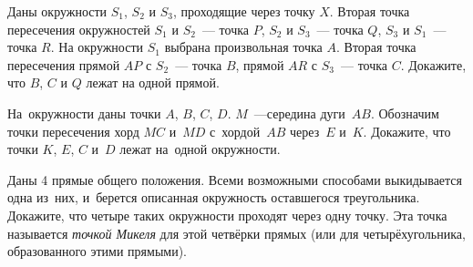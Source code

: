 \begin{problems}

\item
Даны окружности $S_1$, $S_2$ и $S_3$, проходящие через точку $X$.
Вторая точка пересечения окружностей $S_1$ и $S_2$~--- точка $P$,
$S_2$ и $S_3$~--- точка $Q$, $S_3$ и $S_1$~--- точка $R$.
На окружности $S_1$ выбрана произвольная точка $A$.
Вторая точка пересечения прямой $AP$ с $S_2$~--- точка $B$,
прямой $AR$ с $S_3$~--- точка $C$.
Докажите, что $B$, $C$ и $Q$ лежат на одной прямой.

\item
На~окружности даны точки $A$, $B$, $C$, $D$.
$M$~---середина дуги~$AB$.
Обозначим точки пересечения хорд $MC$ и~$MD$ с~хордой~$AB$ через~$E$ и~$K$.
Докажите, что точки $K$, $E$, $C$ и~$D$ лежат на~одной окружности.

\item
Даны 4 прямые общего положения.
Всеми возможными способами выкидывается одна из~них, и~берется описанная
окружность оставшегося треугольника.
Докажите, что четыре таких окружности проходят через одну точку.
Эта точка называется \emph{точкой Микеля} для этой четвёрки прямых
(или для четырёхугольника, образованного этими прямыми).

\end{problems}

